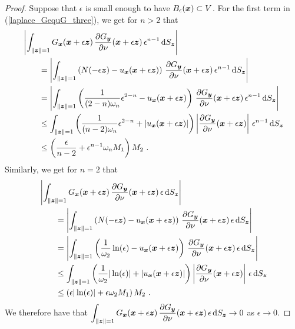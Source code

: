 \begin{proof}
Suppose that $\epsilon$ is small enough to have
$B_\epsilon({\bm{x}}) \subset V$.
For the first term in (\ref{laplace_GequG_three}),
we get for $n>2$ that
\begin{align*}
&\left| \int_{\|{\bm{z}}\|=1}
G_{{\bm{x}}}({\bm{x}}+\epsilon {\bm{z}})
\,\frac{\partial{G_{{\bm{y}}}}}{\partial \nu}({\bm{x}}+\epsilon {\bm{z}})
\, \epsilon^{n-1} \,\mathrm{d}{S}_{{\bm{z}}} \right| \\
&\qquad = \left| \int_{\|{\bm{z}}\|=1}
\left( N(-\epsilon{\bm{z}}) - u_{{\bm{x}}}({\bm{x}} + \epsilon {\bm{z}}) \right)
\,\frac{\partial{G_{{\bm{y}}}}}{\partial \nu}({\bm{x}}+\epsilon {\bm{z}})
\,\epsilon^{n-1} \,\mathrm{d}{S}_{{\bm{z}}} \right| \\
&\qquad = \left| \int_{\|{\bm{z}}\|=1}
\left( \frac{1}{(2-n)\omega_n} \epsilon^{2-n} -
u_{{\bm{x}}}({\bm{x}} + \epsilon {\bm{z}})  \right)
\,\frac{\partial{G_{{\bm{y}}}}}{\partial \nu}({\bm{x}} + \epsilon {\bm{z}})
\, \epsilon^{n-1} \,\mathrm{d}{S}_{{\bm{z}}} \right| \\
&\qquad \leq \int_{\|{\bm{z}}\|=1}
\left( \frac{1}{(n-2)\omega_n} \epsilon^{2-n} +
\left| u_{{\bm{x}}}({\bm{x}} + \epsilon {\bm{z}}) \right| \right)
\left| \frac{\partial{G_{{\bm{y}}}}}{\partial \nu}({\bm{x}} + \epsilon {\bm{z}})
\right|\, \epsilon^{n-1} \,\mathrm{d}{S}_{{\bm{z}}} \\
&\qquad \leq \left(\frac{\epsilon}{n-2} +
\epsilon^{n-1} \omega_n M_1\right) M_2 \ . 
\end{align*}
Similarly, we get for $n=2$ that
\begin{align*}
&\left| \int_{\|{\bm{z}}\|=1}
G_{{\bm{x}}}({\bm{x}}+\epsilon {\bm{z}})
\,\frac{\partial{G_{{\bm{y}}}}}{\partial \nu}({\bm{x}}+\epsilon {\bm{z}})
\, \epsilon \,\mathrm{d}{S}_{{\bm{z}}} \right| \\
&\qquad = \left| \int_{\|{\bm{z}}\|=1}
\left( N(-\epsilon{\bm{z}}) - u_{{\bm{x}}}({\bm{x}} + \epsilon {\bm{z}}) \right)
\,\frac{\partial{G_{{\bm{y}}}}}{\partial \nu}({\bm{x}}+\epsilon {\bm{z}})
\, \epsilon \,\mathrm{d}{S}_{{\bm{z}}} \right| \\
&\qquad = \left| \int_{\|{\bm{z}}\|=1}
\left( \frac{1}{\omega_2} \ln(\epsilon) -
u_{{\bm{x}}}({\bm{x}} + \epsilon {\bm{z}}) \right)
\,\frac{\partial{G_{{\bm{y}}}}}{\partial \nu}({\bm{x}} + \epsilon {\bm{z}})
\, \epsilon \,\mathrm{d}{S}_{{\bm{z}}} \right| \\
&\qquad \leq \int_{\|{\bm{z}}\|=1}
\left( \frac{1}{\omega_2} |\ln(\epsilon)|  +
\left| u_{{\bm{x}}}({\bm{x}} + \epsilon {\bm{z}}) \right| \right)
\left| \frac{\partial{G_{{\bm{y}}}}}{\partial \nu}({\bm{x}} + \epsilon {\bm{z}})
\right|\, \epsilon \,\mathrm{d}{S}_{{\bm{z}}} \\
&\qquad
\leq \left( \epsilon |\ln(\epsilon)| + \epsilon \omega_2 M_1 \right) M_2 \ . 
\end{align*}
We therefore have that
$\displaystyle \int_{\|{\bm{z}}\|=1}
G_{{\bm{x}}}({\bm{x}}+\epsilon {\bm{z}})
\,\frac{\partial{G_{{\bm{y}}}}}{\partial \nu}({\bm{x}}+\epsilon {\bm{z}})
\, \epsilon \,\mathrm{d}{S}_{{\bm{z}}} \to 0$ 
as $\epsilon \to 0$.


\end{proof}

